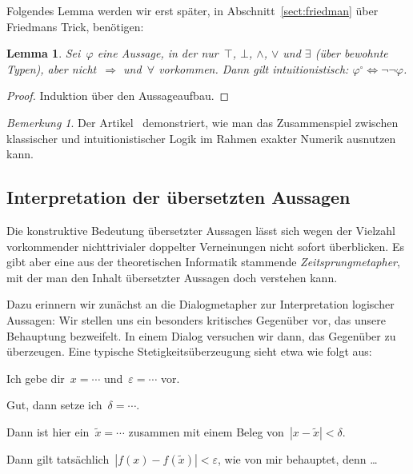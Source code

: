 \documentclass[a4paper,ngerman,12pt]{scrartcl}
\theoremstyle{definition}
\theoremstyle{plain}
\newtheorem{lemma}[defn]{Lemma}
\theoremstyle{remark}
\newtheorem{bem}[defn]{Bemerkung}
\renewcommand{\_}{\mathpunct{.}\,}
\newcommand{\?}{\,{:}\,}
\newcommand{\Alice}{\item[Alice]}
\newcommand{\Eve}{\item[Eve]}
\newenvironment{dialogue}[1]{%
  \begin{list}{}{%
    \settowidth{\labelwidth}{\qquad\emph{#1:}}
    \setlength{\labelsep}{0.3cm}
    \setlength{\leftmargin}{\labelwidth}
    \addtolength{\leftmargin}{\labelsep}
    \setlength{\rightmargin}{0pt}
    \setlength{\parsep}{0.5ex plus 0.2ex minus 0.1ex}
    \setlength{\itemsep}{0 ex plus 0.2ex}
    \renewcommand{\makelabel}[1]{\qquad\emph{##1:}\hfil}
    }
}{\end{list}}
\begin{document}
Folgendes Lemma werden wir erst später, in Abschnitt~\ref{sect:friedman} über
Friedmans Trick, benötigen:
\begin{lemma}\label{dnt:geom}Sei~$\varphi$ eine Aussage, in der nur~$\top$, $\bot$,
$\wedge$, $\vee$ und $\exists$ (über
bewohnte Typen), aber nicht~$\Rightarrow$ und~$\forall$ vorkommen. Dann gilt
intuitionistisch: $\varphi^\circ \Longleftrightarrow \neg\neg\varphi$.
\end{lemma}
\begin{proof}Induktion über den Aussageaufbau.\end{proof}

\begin{bem}Der Artikel~\cite{oconnor:exact} demonstriert, wie man das
Zusammenspiel zwischen klassischer und intuitionistischer Logik im Rahmen
exakter Numerik ausnutzen kann.\end{bem}



\subsection{Interpretation der übersetzten Aussagen}

Die konstruktive Bedeutung übersetzter Aussagen lässt sich wegen der Vielzahl
vorkommender nichttrivialer doppelter Verneinungen nicht sofort überblicken. Es
gibt aber eine aus der theoretischen Informatik stammende
\emph{Zeitsprungmetapher}, mit der man den Inhalt übersetzter Aussagen doch
verstehen kann.

Dazu erinnern wir zunächst an die Dialogmetapher zur Interpretation logischer
Aussagen:
Wir stellen uns ein besonders kritisches Gegenüber vor, das unsere Behauptung
bezweifelt. In einem Dialog versuchen wir dann, das Gegenüber zu überzeugen.
Eine typische Stetigkeitsüberzeugung sieht etwa wie folgt aus:

\begin{dialogue}{Alice}
\Eve Ich gebe dir~$x = \cdots$ und~$\varepsilon = \cdots$ vor.
\Alice Gut, dann setze ich~$\delta = \cdots$.
\Eve Dann ist hier ein~$\tilde x = \cdots$ zusammen mit einem Beleg von~$|x -
\tilde x| < \delta$.
\Alice Dann gilt tatsächlich~$|f(x) - f(\tilde x)| < \varepsilon$,
wie von mir behauptet, denn \ldots
\end{dialogue}
\end{document}
